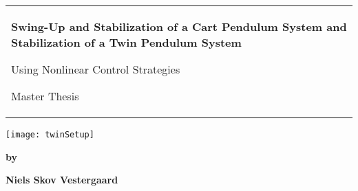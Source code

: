 %
 \noindent%
  \vspace{-1.5cm}
  \begin{center}
    \noindent{\color{aaublue}\rule{\textwidth}{.5pt}}
  \end{center}
  \vspace{-.5cm}
  \begin{tabular}{@{}p{\textwidth}@{}}
    \begin{center}
      \Large{\textbf{
        Swing-Up and Stabilization of a Cart Pendulum System and  Stabilization of a Twin Pendulum System
      }}
    \end{center}
    \begin{center}
      \large{
        Using Nonlinear Control Strategies
      }
    \end{center}
    \begin{center}
      \large{
        Master Thesis %
      }
    \end{center}
  \end{tabular}
  \begin{center}
    \texttt{[image: twinSetup]}
  \end{center}
  \vfill
  \begin{center}
    \textbf{by}
    
    \textbf{Niels Skov Vestergaard}
  \end{center}
\clearpage